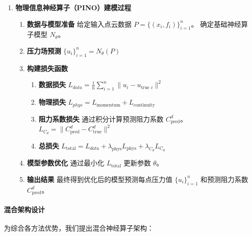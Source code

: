 \documentclass{MMCStyle}
\begin{document}
\begin{enumerate}
    
    \item \textbf{物理信息神经算子（PINO）建模过程}
    \begin{enumerate}
        \item \textbf{数据与模型准备}
        给定输入点云数据 \(P = \{(x_i, f_i)\}_{i = 1}^n\)。
        确定基础神经算子模型 \(N_{\theta}\)。
        \item \textbf{压力场预测}
        \(\{u_i\}_{i = 1}^n = N_{\theta}(P)\)
        \item \textbf{构建损失函数}
        \begin{enumerate}
            \item \textbf{数据损失}
            \(L_{data} = \frac{1}{n}\sum_{i = 1}^{n}\|u_i - u_{\text{true }i}\|^2\)
            \item \textbf{物理损失}
            \(L_{phys} = L_{\text{momentum}} + L_{\text{continuity}}\)
            \item \textbf{阻力系数损失}
            通过积分计算预测阻力系数 \(C_{\text{pred}}^d\)。
            \(L_{C_d} = \|C_{\text{pred}}^d - C_{\text{true}}^d\|^2\)
            \item \textbf{总损失}
            \(L_{\text{total}} = L_{data} + \lambda_{\text{phys}}L_{\text{phys}} + \lambda_{C_d}L_{C_d}\)
        \end{enumerate}
        \item \textbf{模型参数优化}
        通过最小化 \(L_{\text{total}}\) 更新参数 \(\theta\)。
        \item \textbf{输出结果}
        最终得到优化后的模型预测每点压力值 \(\{u_i\}_{i = 1}^n\) 和预测阻力系数 \(C_{\text{pred}}^d\)。
    \end{enumerate}
    \end{enumerate}






\paragraph{混合架构设计}

为综合各方法优势，我们提出混合神经算子架构：
\end{document}
